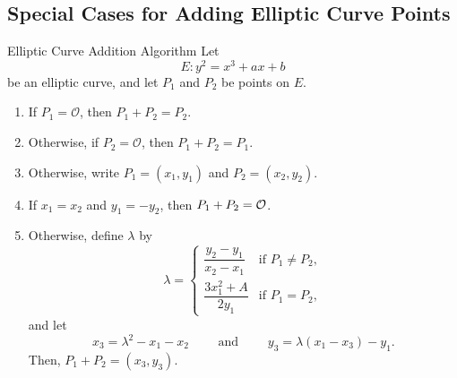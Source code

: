 
\subsection{Special Cases for Adding Elliptic Curve Points}

\begin{theorem}
    {Elliptic Curve Addition Algorithm} Let
    \[
        E \colon y^{2} = x^{3} + ax + b
    \]
    be an elliptic curve, and let \(P_{1}\) and \(P_{2}\) be points on \(E\).
    \begin{enumerate}[label=(\alph*)]
        \item If \(P_{1} = \mathcal{O}\), then \(P_{1} + P_{2} = P_{2}\).
        \item Otherwise, if \(P_{2} = \mathcal{O}\), then \(P_{1} + P_{2} = P_{1}\).
        \item Otherwise, write \(P_{1} = (x_{1}, y_{1})\) and \(P_{2} =(x_{2},y_{2})\).
        \item If \(x_{1} = x_{2}\) and \(y_{1} = -y_{2}\), then \(P_{1} + P_{2} = \mathcal{O}\).
        \item Otherwise, define \(\lambda\) by
              \[\lambda =
                  \begin{cases}
                      \dfrac{y_{2} - y_{1}}{x_{2} - x_{1}} & \text{if } P_{1} \ne P_{2}, \\[0.5cm]
                      \dfrac{3x_{1}^{2} + A}{2y_{1}}       & \text{if } P_{1} = P_{2},
                  \end{cases}
              \]
              and let
              \[
                  x_{3} = \lambda^{2} - x_{1} - x_{2} \qquad \text{ and } \qquad y_{3} = \lambda (x_{1} - x_{3}) - y_{1}.
              \]
              Then, \(P_{1} + P_{2} = (x_{3},y_{3})\).
    \end{enumerate}
\end{theorem}

